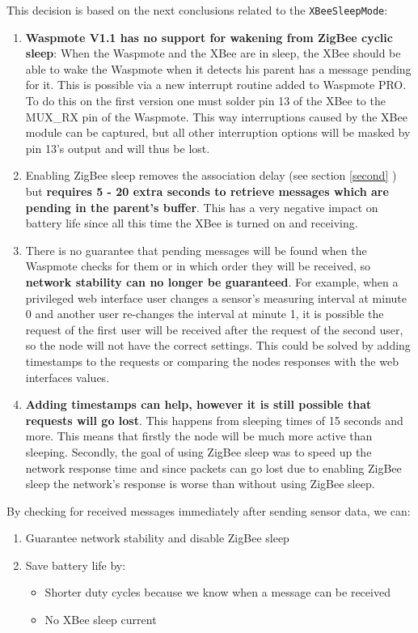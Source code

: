 \noindent
This decision is based on the next conclusions related to the \verb+XBeeSleepMode+:
\begin{enumerate}
\item \textbf{Waspmote V1.1 has no support for wakening from ZigBee cyclic sleep}: When the Waspmote and the XBee are in sleep, the XBee should be able to wake the Waspmote when it detects his parent has a message pending for it. This is possible via a new interrupt routine added to Waspmote PRO. To do this on the first version one must solder pin 13 of the XBee to the MUX\_RX pin of the Waspmote. This way interruptions caused by the XBee module can be captured, but all other interruption options will be masked by pin 13's output and will thus be lost.
\item Enabling ZigBee sleep removes the association delay (see section \ref{second} ) but \textbf{requires 5 - 20 extra seconds to retrieve messages which are pending in the parent's buffer}. This has a very negative impact on battery life since all this time the XBee is turned on and receiving.
\item There is no guarantee that pending messages will be found when the Waspmote checks for them or in which order they will be received, so \textbf{network stability can no longer be guaranteed}. For example, when a privileged web interface user changes a sensor's measuring interval at minute 0 and another user re-changes the interval at minute 1, it is possible the request of the first user will be received after the request of the second user, so the node will not have the correct settings. This could be solved by adding timestamps to the requests or comparing the nodes responses with the web interfaces values. \item \textbf{Adding timestamps can help, however it is still possible that requests will go lost}. This happens from sleeping times of 15 seconds and more. This means that firstly the node will be much more active than sleeping. Secondly, the goal of using ZigBee sleep was to speed up the network response time and since packets can go lost due to enabling ZigBee sleep the network's response is worse than without using ZigBee sleep.
\end{enumerate}
\vspace{0.5cm}
\noindent
By checking for received messages immediately after sending sensor data, we can:
\begin{enumerate}
\item Guarantee network stability and disable ZigBee sleep
\item Save battery life by:
\begin{itemize}
\item Shorter duty cycles because we know when a message can be received
\item No XBee sleep current
\end{itemize} 
\end{enumerate}

